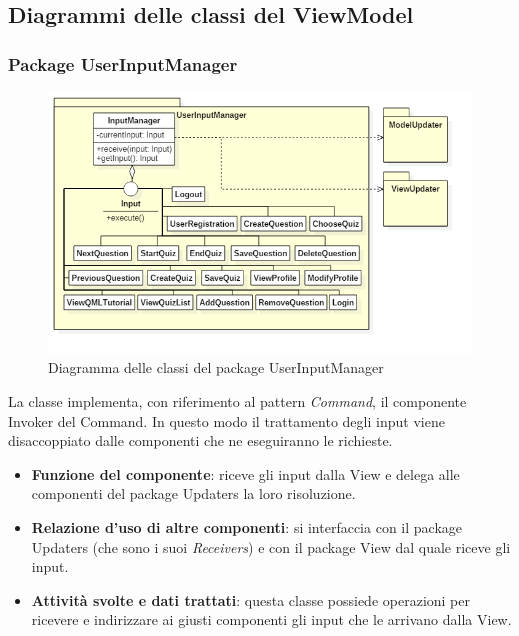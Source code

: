 \subsection{Diagrammi delle classi del ViewModel}
\subsubsection{Package UserInputManager}
\begin{figure}[h!]
	\begin{center}
		\includegraphics[scale=0.65]{../images/UserInputManagerClass.png}
		\caption{Diagramma delle classi del package UserInputManager}
	\end{center}
\end{figure}

La classe implementa, con riferimento al pattern \emph{Command}, il componente Invoker del Command. In questo modo il trattamento degli input viene disaccoppiato dalle componenti che ne eseguiranno le richieste.
\begin{itemize}
	\item\textbf{Funzione del componente}: riceve gli input dalla View e delega alle componenti del package Updaters la loro risoluzione.
	\item\textbf{Relazione d'uso di altre componenti}: si interfaccia con il package Updaters (che sono i suoi \emph{Receivers}) e con il package View dal quale riceve gli input.
	\item\textbf{Attività svolte e dati trattati}: questa classe possiede operazioni per ricevere e indirizzare ai giusti componenti gli input che le arrivano dalla View.
\end{itemize}

